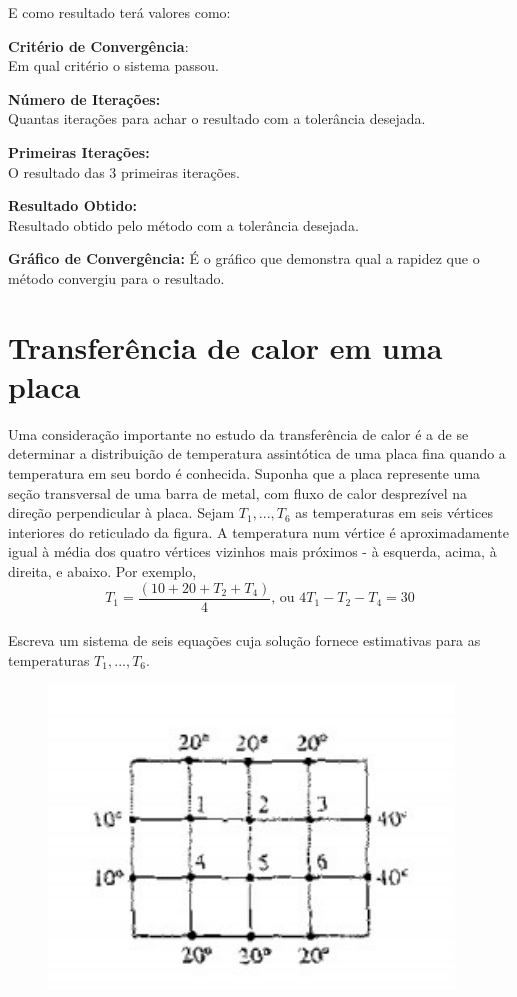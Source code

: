 \documentclass[
	12pt,				%
	openright,			%
	twoside,			%
	a4paper,			%
	english,			%
	french,				%
	spanish,			%
	brazil				%
	]{abntex2_new}
\begin{document}
E como resultado terá valores como:\\
\begin{alineas}

\item{\textbf{Critério de Convergência}:\\
	Em qual critério o sistema passou.}
\item{\textbf{Número de Iterações:}\\
Quantas iterações para achar o resultado com a tolerância desejada.}
\item{\textbf{Primeiras Iterações:}\\
O resultado das 3 primeiras iterações.}
\item{\textbf{Resultado Obtido:}\\
	Resultado obtido pelo método com a tolerância desejada.
}
\item{\textbf{Gráfico de Convergência:}
É o gráfico que demonstra qual a rapidez que o método convergiu para o resultado.
}
\end{alineas}


\section{Transferência de calor em uma placa}
Uma consideração importante no estudo da transferência de calor é a de
se determinar a distribuição de temperatura assintótica de uma placa
fina quando a temperatura em seu bordo é conhecida. Suponha que a placa
represente uma seção transversal de uma barra de metal, com
 fluxo de calor desprezível na direção perpendicular à placa. Sejam
  $T_{1},..., T_6$ as temperaturas em seis vértices interiores do reticulado
  da figura. A temperatura num vértice é aproximadamente igual à média
   dos quatro vértices vizinhos mais próximos - à esquerda, acima, à direita,
   e abaixo. Por exemplo,\\
   
   $$T_1 = \frac{(10+20+T_2+T_4)}{4} \text{, ou } 4 T_1 - T_2 - T_4 = 30$$\\
   
   Escreva um sistema de seis equações cuja solução fornece estimativas para as temperaturas $T_1,...,T_6$.\\
   \begin{figure}[htb]
   \centering

   	\includegraphics[scale=0.7]{figura1.png}

   \end{figure}
\end{document}
